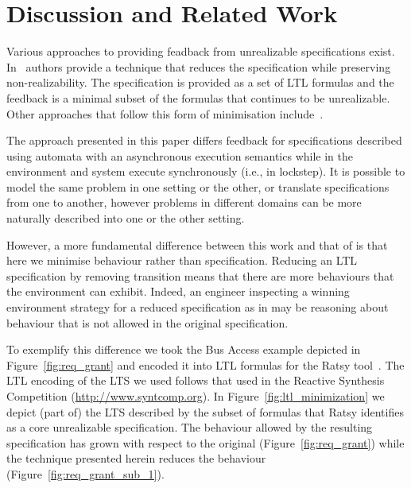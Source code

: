 \section{Discussion and Related Work}

Various approaches to providing feadback from unrealizable specifications exist. In~\cite{DBLP:conf/fmcad/KonighoferHB09} authors provide a technique that reduces the specification while preserving non-realizability. The specification is provided as a set of LTL formulas and the feedback is a minimal subset of the formulas that continues to be unrealizable. Other approaches that follow this form of minimisation include~\cite{DBLP:journals/scp/Schuppan12}.
 
The approach presented in this paper differs feedback for specifications described using automata with an asynchronous execution semantics while in \cite{DBLP:conf/fmcad/KonighoferHB09} the environment and system execute synchronously (i.e., in lockstep). It is possible to model the same problem in one setting or the other, or translate specifications from one to another, however problems in different domains can  be more naturally described into one or the other setting.

However, a more fundamental difference between this work and that of \cite{DBLP:conf/fmcad/KonighoferHB09,shahar} is that here we minimise behaviour rather than specification. Reducing an LTL specification by removing transition means that there are more behaviours that the environment can exhibit. Indeed, an engineer inspecting a winning environment strategy for a reduced specification as in \cite{DBLP:conf/fmcad/KonighoferHB09} may be reasoning about behaviour that is not allowed in the original specification.  

To exemplify this difference we took the Bus Access example depicted in Figure~\ref{fig:req_grant} and encoded it into LTL formulas for the Ratsy tool~\cite{DBLP:conf/cav/BloemCGHKRSS10}. The LTL encoding of the LTS we used follows that used in the Reactive Synthesis Competition (\url{http://www.syntcomp.org}). In Figure~\ref{fig:ltl_minimization} we depict (part of) the LTS described by the subset of formulas that Ratsy identifies as a core unrealizable specification. The behaviour allowed by the resulting specification has grown with respect to the original (Figure~\ref{fig:req_grant}) while the technique presented herein reduces the behaviour (Figure~\ref{fig:req_grant_sub_1}).

